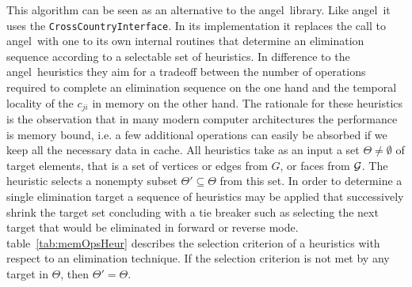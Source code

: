\documentclass{book}
\newcommand{\angel}{angel}
\newcommand{\reftab}[1]{{table~\ref{#1}}}
\begin{document}
This algorithm can be seen as an alternative to the \angel\ library. 
Like \angel\ it uses the \lstinline{CrossCountryInterface}. In its implementation 
it replaces the call to \angel\ with one to its own internal routines that
determine an elimination sequence according to a selectable set of heuristics. 
In difference to the \angel\ heuristics  they 
aim for a tradeoff between the number of operations required to complete an elimination 
sequence on the one hand and the temporal locality of the $c_{ji}$ in memory on the other hand. 
The rationale for these heuristics is the observation that in many modern 
computer architectures the performance is memory bound, i.e. a few additional 
operations can easily be absorbed if we keep all the necessary data in cache. 
All heuristics take as an input a set $\Theta \neq \emptyset $ of target elements, that is 
a set of vertices or edges from $G$, or faces from $\cal G$. 
The heuristic selects a nonempty subset $\Theta'\subseteq \Theta $ from this set. 
In order to determine a single elimination target a sequence of heuristics may be applied 
that successively shrink the target set concluding with a tie breaker such as 
selecting the next target that would be eliminated in forward or reverse mode. 
\reftab{tab:memOpsHeur} describes the selection criterion of a heuristics with 
respect to an elimination technique.  If the selection criterion is not met 
by any target in $\Theta$, then $\Theta'=\Theta$. 
\end{document}
